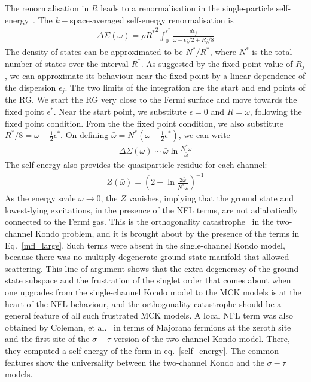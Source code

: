 \documentclass[reprint,prb,superscriptaddress]{revtex4-2}
\begin{document}
The renormalisation in \(R\) leads to a renormalisation in the single-particle self-energy~\cite{anirbanmott1}. The \(k-\)space-averaged self-energy renormalisation is
\begin{equation}\begin{aligned}
	\Delta \Sigma(\omega) = \rho {R^*}^2\int_0^{\epsilon^*} \frac{d\epsilon_j}{\omega - \epsilon_j/2 + R_j/8}
\end{aligned}\end{equation}
The density of states can be approximated to be \(N^*/R^*\), where \(N^*\) is the total number of states over the interval \(R^*\). As suggested by the fixed point value of \(R_j\), we can approximate its behaviour near the fixed point by a linear dependence of the dispersion \(\epsilon_j\). The two limits of the integration are the start and end points of the RG. We start the RG very close to the Fermi surface and move towards the fixed point \(\epsilon^*\). Near the start point, we substitute \(\epsilon = 0\) and \(R = \omega\), following the fixed point condition. From the the fixed point condition, we also substitute \(R^*/8 = \omega - \frac{1}{2}\epsilon^*\). On defining \(\bar \omega = N^* \left(\omega - \frac{1}{2}\epsilon^*\right)\), we can write
\begin{equation}\begin{aligned}
	\label{self_energy}
	\Delta \Sigma(\omega) \sim  \bar \omega \ln \frac{N^* \omega}{\bar \omega}
\end{aligned}\end{equation}
The self-energy also provides the quasiparticle residue for each channel\cite{anirbanmott1}:
\begin{equation}\begin{aligned}
	Z(\bar\omega) = \left(2 - \ln \frac{2\bar\omega}{N^* \omega}\right) ^{-1}
\end{aligned}\end{equation}
{As the energy scale \(\omega \to 0\), the \(Z\) vanishes, implying that the ground state and lowest-lying excitations, in the presence of the NFL terms, are not adiabatically connected to the Fermi gas. This is the orthogonality catastrophe~\cite{varma2002singular,anderson_infraredcat,yamada_catastrophe,yamada1979orthogonality} in the two-channel Kondo problem, and it is brought about by the presence of the terms in Eq.~\ref{mfl_large}}. Such terms were absent in the single-channel Kondo model, because there was no multiply-degenerate ground state manifold that allowed scattering. This line of argument shows that the extra degeneracy of the ground state subspace and the frustration of the singlet order that comes about when one upgrades from the single-channel Kondo model to the MCK models is at the heart of the NFL behaviour, and the orthogonality catastrophe should be a general feature of all such frustrated MCK models. A local NFL term was also obtained by Coleman, et al.~\cite{Coleman_tsvelik} in terms of Majorana fermions at the zeroth site and the first site of the \(\sigma-\tau\) version of the two-channel Kondo model. There, they computed a self-energy of the form in eq.~\ref{self_energy}. The common features show the universality between the two-channel Kondo and the \(\sigma-\tau\) models. 
\end{document}
